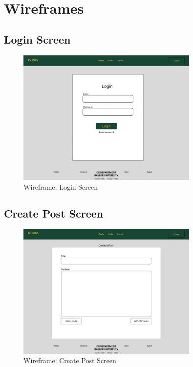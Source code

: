 \documentclass{article}
\begin{document}
\section{Wireframes}
\subsection{Login Screen}
\begin{figure}[H]
    \centering
    \includegraphics[width=0.8\textwidth]{images/wireframe_login.png}
    \centering
    \caption{Wireframe: Login Screen}
\end{figure}

\subsection{Create Post Screen}
\begin{figure}[H]
    \centering
    \includegraphics[width=0.8\textwidth]{images/wireframe_createPost.png}
    \centering
    \caption{Wireframe: Create Post Screen}
\end{figure}
\end{document}
